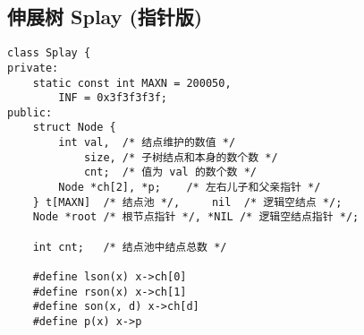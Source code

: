 \subsection{伸展树 Splay (指针版)}
\begin{verbatim}
class Splay {
private:
    static const int MAXN = 200050,
        INF = 0x3f3f3f3f;
public:
    struct Node {
        int val,  /* 结点维护的数值 */
            size, /* 子树结点和本身的数个数 */
            cnt;  /* 值为 val 的数个数 */
        Node *ch[2], *p;    /* 左右儿子和父亲指针 */
    } t[MAXN]  /* 结点池 */,     nil  /* 逻辑空结点 */;
    Node *root /* 根节点指针 */, *NIL /* 逻辑空结点指针 */;
    
    int cnt;   /* 结点池中结点总数 */
    
    #define lson(x) x->ch[0]
    #define rson(x) x->ch[1]
    #define son(x, d) x->ch[d]
    #define p(x) x->p
    

\end{verbatim}
